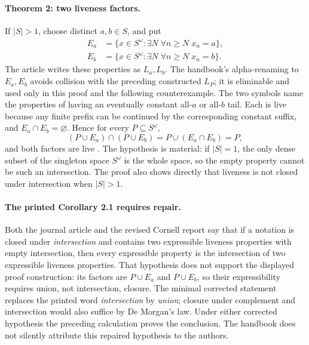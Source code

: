 \paragraph{Theorem 2: two liveness factors.}
If \(|S|>1\), choose distinct \(a,b\in S\), and put
\[
 \begin{aligned}
 E_a&=\{x\in S^\omega:\exists N\;\forall n\ge N\;x_n=a\},\\
 E_b&=\{x\in S^\omega:\exists N\;\forall n\ge N\;x_n=b\}.
\end{aligned}
\]
The article writes these properties as \(L_a,L_b\).  The handbook's
alpha-renaming to \(E_a,E_b\) avoids collision with the preceding constructed
\(L_P\); it is eliminable and used only in this proof and the following
counterexample.  The two symbols name the properties of having an eventually
constant all-\(a\) or all-\(b\) tail.  Each is live because any
finite prefix can be continued by the corresponding constant suffix, and
\(E_a\cap E_b=\varnothing\).  Hence for every
\(P\subseteq S^\omega\),
\[
 (P\cup E_a)\cap(P\cup E_b)
 =P\cup(E_a\cap E_b)
 =P,
\]
and both factors are live \cite[Theorem~2, p.~184]{AlpernSchneider1985}.
The hypothesis is material: if \(|S|=1\), the only dense subset of the
singleton space \(S^\omega\) is the whole space, so the empty property cannot
be such an intersection.  The proof also shows directly that liveness is not
closed under intersection when \(|S|>1\).

\paragraph{The printed Corollary 2.1 requires repair.}
Both the journal article and the revised Cornell report say that if a notation
is closed under \emph{intersection} and contains two expressible liveness
properties with empty intersection, then every expressible property is the
intersection of two expressible liveness properties.  That hypothesis does
not support the displayed proof construction: its factors are
\(P\cup E_a\) and \(P\cup E_b\), so their expressibility requires union, not
intersection, closure.  The minimal corrected statement replaces the printed
word \emph{intersection} by \emph{union}; closure under complement and
intersection would also suffice by De Morgan's law.  Under either corrected
hypothesis the preceding calculation proves the conclusion.  The handbook
does not silently attribute this repaired hypothesis to the authors.

